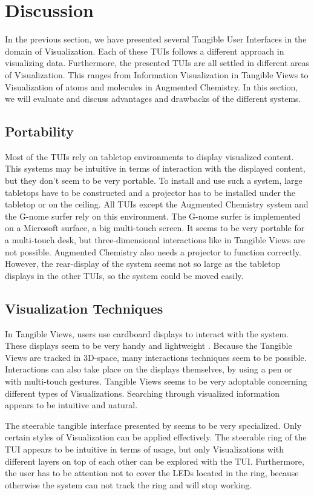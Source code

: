\section{Discussion}
In the previous section, we have presented several Tangible User Interfaces in the domain of Visualization. Each of these TUIs follows a different approach in visualizing data. Furthermore, the presented TUIs are all settled in different areas of Visualization. This ranges from Information Visualization in Tangible Views to Visualization of atoms and molecules in Augmented Chemistry. In this section, we will evaluate and discuss advantages and drawbacks of the different systems. 

\subsection{Portability}
Most of the TUIs rely on tabletop environments to display visualized content. This systems may be intuitive in terms of interaction with the displayed content, but they don't seem to be very portable. To install and use such a system, large tabletops have to be constructed and a projector has to be installed under the tabletop or on the ceiling. All TUIs except the Augmented Chemistry system and the G-nome surfer rely on this environment. The G-nome surfer is implemented on a Microsoft surface, a big multi-touch screen. It seems to be very portable for a multi-touch desk, but three-dimensional interactions like in Tangible Views are not possible. Augmented Chemistry also needs a projector to function correctly. However, the rear-display of the system seems not so large as the tabletop displays in the other TUIs, so the system could be moved easily. 

\subsection{Visualization Techniques}
In Tangible Views, users use cardboard displays to interact with the system. These displays seem to be very handy and lightweight . Because the Tangible Views are tracked in 3D-space, many interactions techniques seem to be possible. Interactions can also take place on the displays themselves, by using a pen or with multi-touch gestures. Tangible Views seems to be very adoptable concerning different types of Visualizations. Searching through visualized information appears to be intuitive and natural. 

The steerable tangible interface presented by \cite{lee09} seems to be very specialized. Only certain styles of Visualization can be applied effectively. The steerable ring of the TUI appears to be intuitive in terms of usage, but only Visualizations with different layers on top of each other can be explored with the TUI. Furthermore, the user has to be attention not to cover the LEDs located in the ring, because otherwise the system can not track the ring and will stop working. 

